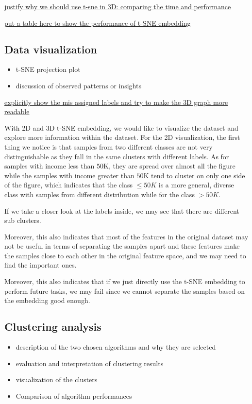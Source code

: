 \documentclass{article}
\begin{document}
\underline{justify why we should use t-sne in 3D: comparing the time and performance}

\underline{put a table here to show the performance of t-SNE embedding}


\subsection{Data visualization}

\begin{itemize}
    \item t-SNE projection plot
    \item discussion of observed patterns or insights
\end{itemize}

\underline{explicitly show the mis assigned labels and try to make the 3D graph more readable}

With 2D and 3D t-SNE embedding, we would like to visualize the dataset and explore more information within the dataset. For the 2D visualization, the first thing we notice is that samples from two different classes are not very distinguishable as they fall in the same clusters with different labels. As for samples with income less than $50$K, they are spread over almost all the figure while the samples with income greater than $50$K tend to cluster on only one side of the
figure, which indicates that the class $\le 50K$ is a more general, diverse class with samples from different distribution while for the class $>50K$. 

If we take a closer look at the labels inside, we may see that there are different sub clusters.

Moreover, this also indicates that most of the features in the original dataset may not be useful in terms of separating the samples apart and these features make the samples close to each other in the original feature space, and we may need to find the important ones.

Moreover, this also indicates that if we just directly use the t-SNE embedding to perform future tasks, we may fail since we cannot separate the samples based on the embedding good enough.

\subsection{Clustering analysis}

\begin{itemize}
    \item description of the two chosen algorithms and why they are selected
    \item evaluation and interpretation of clustering results
    \item visualization of the clusters
    \item Comparison of algorithm performances
\end{itemize}
\end{document}
